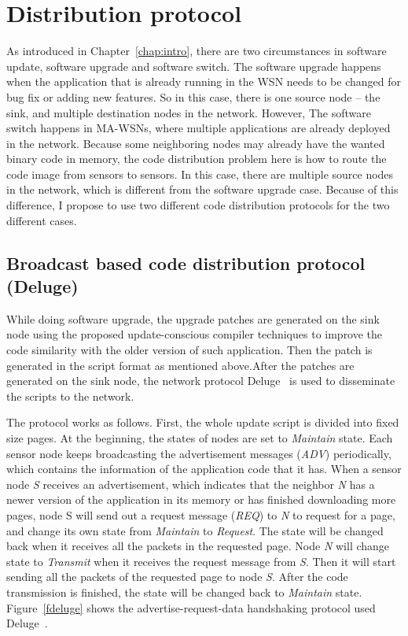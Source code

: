 \chapter{Distribution protocol}

As introduced in Chapter~\ref{chap:intro}, there are two circumstances in software update,  software upgrade and 
software switch. The software upgrade happens when the application that is already running in the WSN needs to be 
changed for bug fix or adding new features. So in this case, there is one source node -- the sink, and multiple 
destination nodes in the network. However, The software switch happens in MA-WSNs, where multiple applications are 
already deployed in the network. Because some neighboring nodes may already have the wanted binary code in memory, the 
code distribution problem here is how to route the code image from sensors to sensors. In this case, there are multiple 
source nodes in the network, which is different from the software upgrade case. Because of this difference, I propose 
to use two different code distribution protocols for the two different cases.


\section{Broadcast based code distribution protocol (Deluge)}
While doing software upgrade, the upgrade patches are generated on the sink node using the proposed update-conscious 
compiler techniques to improve the code similarity with the older version of such application. Then the patch is 
generated in the script format as mentioned above.After the patches are generated on the sink node, the network 
protocol Deluge~\cite{deluge} is used to disseminate the scripts to the network. 

The protocol works as follows. 
First, the whole update script is divided into fixed size pages.
At the beginning, the states of nodes are set to {\it Maintain} state. 
Each sensor node keeps broadcasting the advertisement messages ({\it ADV}) periodically,
which contains the information of the application code that it has. 
When a sensor node {\it S} receives an advertisement, which indicates that the neighbor 
{\it N} has a newer version of the application in its memory or has finished downloading more pages, node S will send 
out a request message ({\it REQ})
to {\it N} to request for a page, and change its own state from {\it Maintain} to {\it Request}.
The state will be changed back when it receives all the packets in the requested page.
Node {\it N} will change state to {\it Transmit} when it receives the request message from
{\it S}. Then it will start sending all the packets of the requested page to node {\it S}.
After the code transmission is finished, the state will be changed back to {\it Maintain} state.
Figure~\ref{fdeluge} shows the advertise-request-data handshaking protocol used Deluge~\cite{deluge}.

